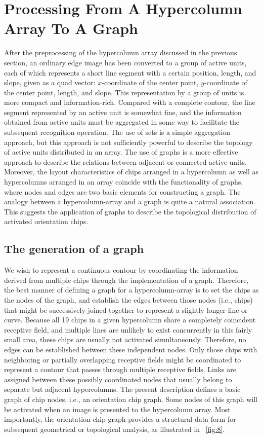 \documentclass{article}
\begin{document}
\section{Processing From A Hypercolumn Array To A Graph}

After the preprocessing of the hypercolumn array discussed in the previous section, 
an ordinary edge image has been converted to a group of active units, 
each of which represents a short line segment with a certain position, length, and slope, 
given as a quad vector: $x$-coordinate of the center point, 
$y$-coordinate of the center point, length, and slope. 
This representation by a group of units is more compact and information-rich. 
Compared with a complete contour, the line segment represented by an active unit is somewhat fine, 
and the information obtained from active units must be aggregated in some way to facilitate the subsequent recognition operation. 
The use of sets is a simple aggregation approach, 
but this approach is not sufficiently powerful to describe the topology of active units distributed in an array. 
The use of graphs is a more effective approach to describe the relations between adjacent or connected active units. 
Moreover, the layout characteristics of chips arranged in a hypercolumn as well as hypercolumns arranged in an array coincide with the functionality of graphs, 
where nodes and edges are two basic elements for constructing a graph. 
The analogy between a hypercolumn-array and a graph is quite a natural association. 
This suggests the application of graphs to describe the topological distribution of activated orientation chips.

\subsection{The generation of a graph}

We wish to represent a continuous contour by coordinating the information derived from multiple chips through the implementation of a graph. 
Therefore, the best manner of defining a graph for a hypercolumn-array is to set the chips as the nodes of the graph, 
and establish the edges between those nodes (i.e., chips) that might be successively joined together to represent a slightly longer line or curve. 
Because all 19 chips in a given hypercolumn share a completely coincident receptive field, 
and multiple lines are unlikely to exist concurrently in this fairly small area, 
these chips are usually not activated simultaneously.
Therefore, no edges can be established between these independent nodes. 
Only those chips with neighboring or partially overlapping receptive fields might be coordinated to represent a contour that passes through multiple receptive fields. 
Links are assigned between these possibly coordinated nodes that usually belong to separate but adjacent hypercolumns. 
The present description defines a basic graph of chip nodes, i.e., an orientation chip graph. 
Some nodes of this graph will be activated when an image is presented to the hypercolumn array. 
Most importantly, the orientation chip graph provides a structural data form for subsequent geometrical or topological analysis, as illustrated in \figurename~\ref{fig:8}.
\end{document}

